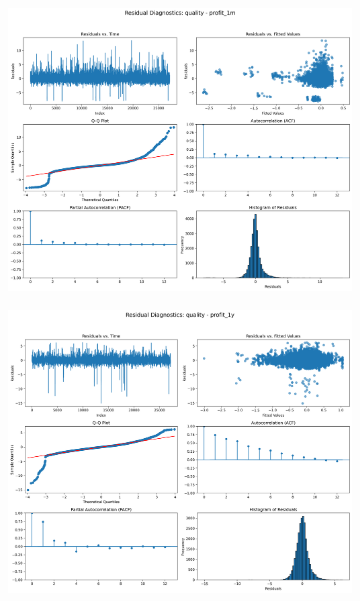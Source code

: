 \documentclass[11pt,english,a4paper,hidelinks]{book}
\begin{document}
\begin{figure}[H]
    \centering
    \begin{subfigure}[b]{0.32\textwidth}
        \centering
        \includegraphics[width=\textwidth]{images/code/models/linear_regression/third_model/AS/quality_profit_1m_residuals.png}
    \end{subfigure}
    \hfill
    \begin{subfigure}[b]{0.32\textwidth}
        \centering
        \includegraphics[width=\textwidth]{images/code/models/linear_regression/third_model/AS/quality_profit_1y_residuals.png}

\end{subfigure}
\end{figure}
\end{document}
